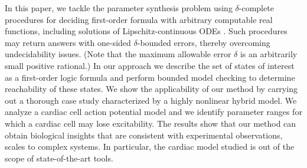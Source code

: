 In this paper, we tackle the parameter synthesis problem using $\delta$-complete procedures \cite{gao12a} 
for deciding first-order formula with arbitrary computable real functions, including solutions 
of Lipschitz-continuous ODEs \citep{gao12b}. Such procedures may return answers with
one-sided $\delta$-bounded errors, thereby overcoming undecidability issues. (Note that the maximum 
allowable error $\delta$ is an arbitrarily small positive rational.) In our approach we describe 
the set of states of interest as a first-order logic formula and perform bounded model checking \cite{BMC}
to determine reachability of these states. %
We show the applicability of our method by carrying out a thorough case study characterized by 
a highly nonlinear hybrid model. We analyze a cardiac cell action potential 
model \cite{orovio08} and we identify parameter ranges for which a cardiac cell may lose excitability.
The results show that our method can obtain biological insights that are consistent with experimental 
observations, scales to complex systems. In particular, the cardiac model studied is out of the scope of 
state-of-the-art tools.
